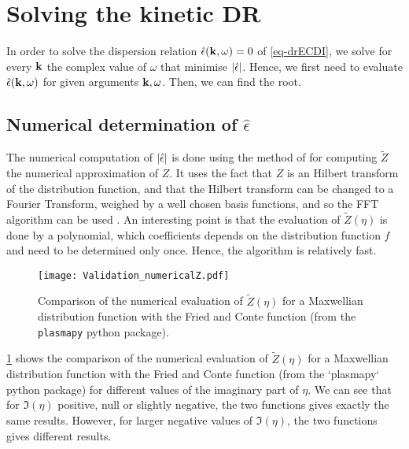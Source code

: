 
\section{Solving the kinetic \ac{DR}}
  \label{sec-DR-solver}
  
  In order to solve the dispersion relation $\hat\epsilon({\mathbf k}, \omega) = 0$ of \cref{eq-drECDI}, we solve for every ${\mathbf k}$ the complex value of $\omega$ that minimise $\lvert\hat\epsilon\rvert$.
  Hence, we first need to evaluate $\hat\epsilon({\mathbf k}, \omega)$ for given arguments ${\mathbf k}, \omega$.
  Then, we can find the root.
  
  \subsection{Numerical determination of $\hat\epsilon$} \label{subsec-numepsilon}
  
  The numerical computation of $\lvert\hat\epsilon\rvert$ is done using the method of \citet{xiehua-sheng2013} for computing $\tilde{Z}$ the numerical approximation of $Z$. 
  It uses the fact that $Z$ is an Hilbert transform of the distribution function, and that the Hilbert transform can be changed to a Fourier Transform, weighed by a well chosen basis functions, and so the \ac{FFT} algorithm can be used \citep{weideman1995}.
  An interesting point is that the evaluation of $\tilde{Z}(\eta)$ is done by a polynomial, which coefficients depends on the distribution function $f$ and need to be determined only once.
  Hence, the algorithm is relatively fast.
  
  \begin{figure}[hbtp]
    \centering
    \texttt{[image: Validation\_numericalZ.pdf]}
    \caption{Comparison of the numerical evaluation of $\tilde{Z}(\eta)$ for a Maxwellian distribution function with the Fried and Conte function (from the \texttt{plasmapy} python package).  }
    \label{fig-numZ}
  \end{figure}
  \cref{fig-numZ} shows the comparison of the numerical evaluation of $\tilde{Z}(\eta)$ for a Maxwellian distribution function with the Fried and Conte function (from the `plasmapy` python package) for different values of the imaginary part of $\eta$.
  We can see that for $\Im(\eta)$ positive, null or slightly negative, the two functions gives exactly the same results.
  However, for larger negative values of $\Im(\eta)$, the two functions gives different results.
  
